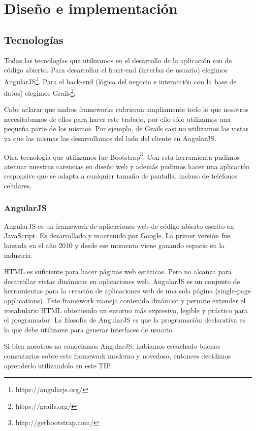 \section{Diseño e implementación}
\subsection{Tecnologías}
Todas las tecnologías que utilizamos en el desarrollo de la aplicación son de código abierto. Para desarrollar el front-end (interfaz de usuario) elegimos AngularJS\footnote{https://angularjs.org/}. Para el back-end (lógica del negocio e interacción con la base de datos) elegimos Grails\footnote{https://grails.org/}.

Cabe aclarar que ambos frameworks cubrieron ampliamente todo lo que nosotros necesitabamos de ellos para hacer este trabajo, por ello sólo utilizamos una pequeña parte de los mismos. Por ejemplo, de Grails casi no utilizamos las vistas ya que las mismas las desarrollamos del lado del cliente en AngularJS.

Otra tecnología que utilizamos fue Bootstrap\footnote{http://getbootstrap.com/}. Con esta herramienta pudimos atenuar nuestras carencias en diseño web y además pudimos hacer una aplicación responsive que se adapta a cualquier tamaño de pantalla, incluso de teléfonos celulares.

\subsubsection{AngularJS}
AngularJS es un framework de aplicaciones web de código abierto escrito en JavaScript. Es desarrollado y mantenido por Google. La primer versión fue lanzada en el año 2010 y desde ese momento viene ganando espacio en la industria.

HTML es suficiente para hacer páginas web estáticas. Pero no alcanza para desarrollar vistas dinámicas en aplicaciones web. AngularJS es un conjunto de herramientas para la creación de aplicaciones web de una sola página (single-page applications). Este framework maneja contenido dinámico y permite extender el vocabulario HTML obteniendo un entorno más expresivo, legible y práctico para el programador. La filosofía de AngularJS es que la programación declarativa es la que debe utilizarse para generar interfaces de usuario.

Si bien nosotros no conociamos AngularJS, habiamos escuchado buenos comentarios sobre este framework moderno y novedoso, entonces decidimos aprenderlo utilizandolo en este TIP.
